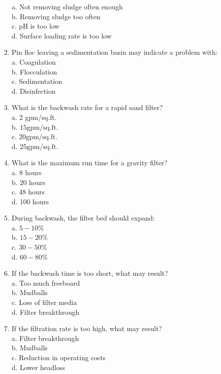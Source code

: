 \begin{enumerate}
a. Not removing sludge often enough\\
b. Removing sludge too often\\
c. $\mathrm{pH}$ is too low\\
d. Surface loading rate is too low\\
\item Pin floc leaving a sedimentation basin may indicate a problem with:\\
a. Coagulation\\
b. Flocculation\\
c. Sedimentation\\
d. Disinfection\\
\item What is the backwash rate for a rapid sand filter?\\
a. 2 gpm/sq.ft.\\
b. $15 \mathrm{gpm} / \mathrm{sq} . \mathrm{ft}$.\\
c. $20 \mathrm{gpm} / \mathrm{sq} . \mathrm{ft}$.\\
d. $25 \mathrm{gpm} / \mathrm{sq} . \mathrm{ft}$.\\
\item What is the maximum run time for a gravity filter?\\
a. 8 hours\\
b. 20 hours\\
c. 48 hours\\
d. 100 hours\\
\item During backwash, the filter bed should expand:\\
a. $5-10 \%$\\
b. $15-20 \%$\\
c. $30-50 \%$\\
d. $60-80 \%$\\
\item If the backwash time is too short, what may result?\\
a. Too much freeboard\\
b. Mudballs\\
c. Loss of filter media\\
d. Filter breakthrough\\
\item If the filtration rate is too high, what may result?\\
a. Filter breakthrough\\
b. Mudballs\\
c. Reduction in operating costs\\
d. Lower headloss\\

\end{enumerate}
